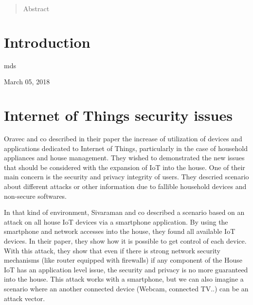 \documentclass[conference]{IEEEtran}
\begin{document}
\maketitle

\begin{abstract}
Abstract 
\end{abstract}





%
\IEEEpeerreviewmaketitle



\section{Introduction}
\label{sec:Intro}
{}
\hfill mds
 
\hfill March 05, 2018


\section{Internet of Things security issues}

Oravec and co \cite{Oravec2017} described in their paper the increase of utilization of devices and applications dedicated to Internet of Things, particularly in the case of household appliances and house management. They wished to demonstrated the new issues that should be considered with the expansion of IoT into the house. One of their main concern is the security and privacy integrity of users. They descried scenario about different attacks or other information due to fallible household devices and non-secure softwares. 

In that kind of environment, Sivaraman and co\cite{Sivaraman2016} described a scenario based on an attack on all house IoT devices via a smartphone application. By using the smartphone and network accesses into the house, they found all available IoT devices. In their paper, they show how it is possible to get control of each device. With this attack, they show that even if there is strong network security mechanisms (like router equipped with firewalls) if any component of the House IoT has an application level issue, the security and privacy is no more guaranteed into the house. This attack works with a smartphone, but we can also imagine a scenario where an another connected device (Webcam, connected TV..) can be an attack vector. 
\end{document}
